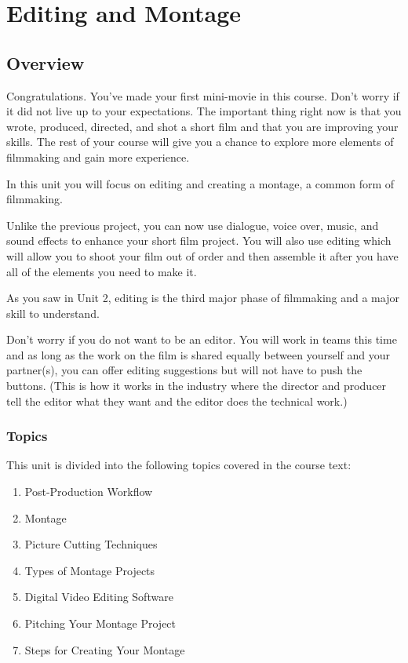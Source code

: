 \documentclass[
  letterpaper,
  DIV=11,
  numbers=noendperiod]{scrreprt}
\providecommand{\tightlist}{%
  \setlength{\itemsep}{0pt}\setlength{\parskip}{0pt}}\usepackage{longtable,booktabs,array}
\begin{document}
\chapter{Editing and Montage}\label{editing-and-montage}

\section*{Overview}\label{overview-6}


Congratulations. You've made your first mini-movie in this course. Don't
worry if it did not live up to your expectations. The important thing
right now is that you wrote, produced, directed, and shot a short film
and that you are improving your skills. The rest of your course will
give you a chance to explore more elements of filmmaking and gain more
experience.

In this unit you will focus on editing and creating a montage, a common
form of filmmaking.

Unlike the previous project, you can now use dialogue, voice over,
music, and sound effects to enhance your short film project. You will
also use editing which will allow you to shoot your film out of order
and then assemble it after you have all of the elements you need to make
it.

As you saw in Unit 2, editing is the third major phase of filmmaking and
a major skill to understand.

Don't worry if you do not want to be an editor. You will work in teams
this time and as long as the work on the film is shared equally between
yourself and your partner(s), you can offer editing suggestions but will
not have to push the buttons. (This is how it works in the industry
where the director and producer tell the editor what they want and the
editor does the technical work.)

\subsection*{Topics}\label{topics-6}

This unit is divided into the following topics covered in the course
text:

\begin{enumerate}
\def\labelenumi{\arabic{enumi}.}
\tightlist
\item
  Post-Production Workflow
\item
  Montage
\item
  Picture Cutting Techniques
\item
  Types of Montage Projects
\item
  Digital Video Editing Software
\item
  Pitching Your Montage Project
\item
  Steps for Creating Your Montage
\end{enumerate}
\end{document}
